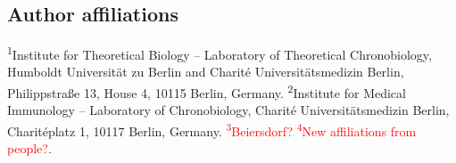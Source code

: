 \subsection*{Author affiliations}
\textsuperscript{1}Institute for Theoretical Biology -- Laboratory of Theoretical Chronobiology, Humboldt Universit\"at zu Berlin and Charit\'e Universit\"atsmedizin Berlin, Philippstra\ss e 13, House 4, 10115 Berlin, Germany. \textsuperscript{2}Institute for Medical Immunology -- Laboratory of Chronobiology, Charité Universitätsmedizin Berlin, Charitéplatz 1, 10117 Berlin, Germany. \textcolor{red}{\textsuperscript{3}Beiersdorf? \textsuperscript{4}New affiliations from people?}.